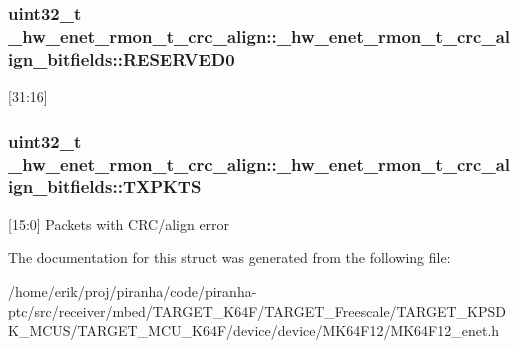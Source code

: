 \subsubsection[{\texorpdfstring{R\+E\+S\+E\+R\+V\+E\+D0}{RESERVED0}}]{\setlength{\rightskip}{0pt plus 5cm}uint32\+\_\+t \+\_\+hw\+\_\+enet\+\_\+rmon\+\_\+t\+\_\+crc\+\_\+align\+::\+\_\+hw\+\_\+enet\+\_\+rmon\+\_\+t\+\_\+crc\+\_\+align\+\_\+bitfields\+::\+R\+E\+S\+E\+R\+V\+E\+D0}\hypertarget{struct__hw__enet__rmon__t__crc__align_1_1__hw__enet__rmon__t__crc__align__bitfields_a48a86bf849b06a06b9b620dbc41bdf21}{}\label{struct__hw__enet__rmon__t__crc__align_1_1__hw__enet__rmon__t__crc__align__bitfields_a48a86bf849b06a06b9b620dbc41bdf21}
\mbox{[}31\+:16\mbox{]} 
\subsubsection[{\texorpdfstring{T\+X\+P\+K\+TS}{TXPKTS}}]{\setlength{\rightskip}{0pt plus 5cm}uint32\+\_\+t \+\_\+hw\+\_\+enet\+\_\+rmon\+\_\+t\+\_\+crc\+\_\+align\+::\+\_\+hw\+\_\+enet\+\_\+rmon\+\_\+t\+\_\+crc\+\_\+align\+\_\+bitfields\+::\+T\+X\+P\+K\+TS}\hypertarget{struct__hw__enet__rmon__t__crc__align_1_1__hw__enet__rmon__t__crc__align__bitfields_a3989ba6bbd3b611627ecf33fed89fb34}{}\label{struct__hw__enet__rmon__t__crc__align_1_1__hw__enet__rmon__t__crc__align__bitfields_a3989ba6bbd3b611627ecf33fed89fb34}
\mbox{[}15\+:0\mbox{]} Packets with C\+R\+C/align error 

The documentation for this struct was generated from the following file\+:\begin{DoxyCompactItemize}
\item 
/home/erik/proj/piranha/code/piranha-\/ptc/src/receiver/mbed/\+T\+A\+R\+G\+E\+T\+\_\+\+K64\+F/\+T\+A\+R\+G\+E\+T\+\_\+\+Freescale/\+T\+A\+R\+G\+E\+T\+\_\+\+K\+P\+S\+D\+K\+\_\+\+M\+C\+U\+S/\+T\+A\+R\+G\+E\+T\+\_\+\+M\+C\+U\+\_\+\+K64\+F/device/device/\+M\+K64\+F12/M\+K64\+F12\+\_\+enet.\+h\end{DoxyCompactItemize}
